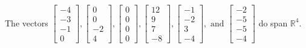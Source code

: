 \begin{exercise}
\begin{exerciseStatement}
  \end{exerciseStatement}
  \begin{exerciseAnswer}
   The vectors \(\left[\begin{array}{r}
-4 \\
-3 \\
-1 \\
0
\end{array}\right] , \left[\begin{array}{r}
0 \\
0 \\
-2 \\
4
\end{array}\right] , \left[\begin{array}{r}
0 \\
0 \\
0 \\
0
\end{array}\right] , \left[\begin{array}{r}
12 \\
9 \\
7 \\
-8
\end{array}\right] , \left[\begin{array}{r}
-1 \\
-2 \\
3 \\
-4
\end{array}\right] , \text{ and } \left[\begin{array}{r}
-2 \\
-5 \\
-5 \\
-4
\end{array}\right]\) 
  	 do  
	span \(\mathbb{R}^4\).
  


  \end{exerciseAnswer}
\end{exercise}